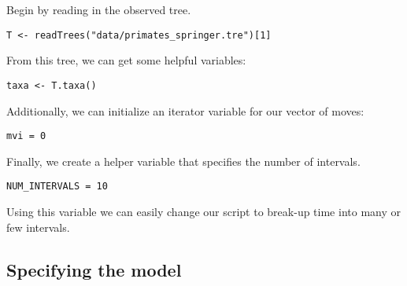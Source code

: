 Begin by reading in the observed tree. 

{\tt \begin{snugshade*}
\begin{lstlisting}
T <- readTrees("data/primates_springer.tre")[1]
\end{lstlisting}
\end{snugshade*}}

From this tree, we can get some helpful variables:
{\tt \begin{snugshade*}
\begin{lstlisting}
taxa <- T.taxa()
\end{lstlisting}
\end{snugshade*}}

Additionally, we can initialize an iterator variable for our vector of moves:
{\tt \begin{snugshade*}
\begin{lstlisting}
mvi = 0
\end{lstlisting}
\end{snugshade*}}

Finally, we create a helper variable that specifies the number of intervals.
{\tt \begin{snugshade*}
\begin{lstlisting}
NUM_INTERVALS = 10
\end{lstlisting}
\end{snugshade*}}
Using this variable we can easily change our script to break-up time into many or few intervals.



\subsection{Specifying the model}

